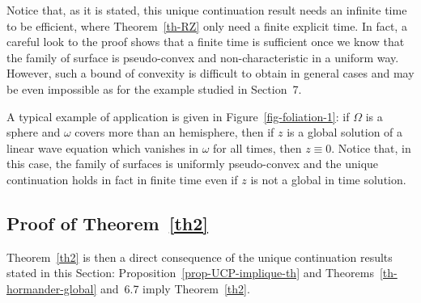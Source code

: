 \documentclass[11pt]{article}
\theoremstyle{definition}
\numberwithin{equation}{section}
\numberwithin{figure}{section}
\numberwithin{table}{section}
\begin{document}
Notice that, as it is stated, this unique continuation result needs an infinite time to be efficient, where Theorem~\ref{th-RZ} only need a finite explicit time. In fact, a careful look to the proof shows that a finite time is sufficient once we know that the family of surface is pseudo-convex and non-characteristic in a uniform way. However, such a bound of convexity is difficult to obtain in general cases and may be even impossible as for the example studied in Section~7.


A typical example of application is given in Figure~\ref{fig-foliation-1}: if $\Omega$ is a sphere and $\omega$ covers more than an hemisphere, then if $z$ is a global solution of a linear wave equation which vanishes in $\omega$ for all times, then $z\equiv 0$. Notice that, in this case, the family of surfaces is uniformly pseudo-convex and the unique continuation holds in fact in finite time even if $z$ is not a global in time solution.



\setcounter{subsection}{3}
\subsection{Proof of Theorem~\ref{th2}}

Theorem~\ref{th2} is then a direct consequence of the unique continuation results stated in this Section: Proposition~\ref{prop-UCP-implique-th} and Theorems~\ref{th-hormander-global} and~6.7 imply Theorem~\ref{th2}.
\end{document}
